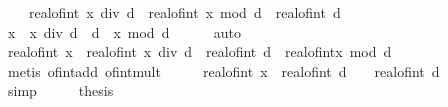 \begin{isabellebody}
\ \ \ \ real{\isacharunderscore}{\kern0pt}of{\isacharunderscore}{\kern0pt}int\ {\isacharparenleft}{\kern0pt}x\ div\ d{\isacharparenright}{\kern0pt}\ {\isacharplus}{\kern0pt}\ {\isacharparenleft}{\kern0pt}real{\isacharunderscore}{\kern0pt}of{\isacharunderscore}{\kern0pt}int\ {\isacharparenleft}{\kern0pt}x\ mod\ d{\isacharparenright}{\kern0pt}{\isacharparenright}{\kern0pt}\ {\isacharslash}{\kern0pt}\ {\isacharparenleft}{\kern0pt}real{\isacharunderscore}{\kern0pt}of{\isacharunderscore}{\kern0pt}int\ d{\isacharparenright}{\kern0pt}{\isachardoublequoteclose}\isanewline
%
\isadelimproof
%
\endisadelimproof
%
\isatagproof
{}\isamarkupfalse%
\ {\isacharminus}{\kern0pt}\isanewline
\ \ \isamarkupfalse%
\ {\isachardoublequoteopen}x\ {\isacharequal}{\kern0pt}\ {\isacharparenleft}{\kern0pt}x\ div\ d{\isacharparenright}{\kern0pt}\ {\isacharasterisk}{\kern0pt}\ d\ {\isacharplus}{\kern0pt}\ x\ mod\ d{\isachardoublequoteclose}\isanewline
\ \ \ \ \isamarkupfalse%
\ auto\isanewline
\ \ \isamarkupfalse%
\ \isamarkupfalse%
\ {\isachardoublequoteopen}real{\isacharunderscore}{\kern0pt}of{\isacharunderscore}{\kern0pt}int\ x\ {\isacharequal}{\kern0pt}\ real{\isacharunderscore}{\kern0pt}of{\isacharunderscore}{\kern0pt}int\ {\isacharparenleft}{\kern0pt}x\ div\ d{\isacharparenright}{\kern0pt}\ {\isacharasterisk}{\kern0pt}\ real{\isacharunderscore}{\kern0pt}of{\isacharunderscore}{\kern0pt}int\ d\ {\isacharplus}{\kern0pt}\ real{\isacharunderscore}{\kern0pt}of{\isacharunderscore}{\kern0pt}int{\isacharparenleft}{\kern0pt}x\ mod\ d{\isacharparenright}{\kern0pt}{\isachardoublequoteclose}\isanewline
\ \ \ \ \isamarkupfalse%
\ {\isacharparenleft}{\kern0pt}metis\ of{\isacharunderscore}{\kern0pt}int{\isacharunderscore}{\kern0pt}add\ of{\isacharunderscore}{\kern0pt}int{\isacharunderscore}{\kern0pt}mult{\isacharparenright}{\kern0pt}\isanewline
\ \ \isamarkupfalse%
\ \isamarkupfalse%
\ {\isachardoublequoteopen}real{\isacharunderscore}{\kern0pt}of{\isacharunderscore}{\kern0pt}int\ x\ {\isacharslash}{\kern0pt}\ real{\isacharunderscore}{\kern0pt}of{\isacharunderscore}{\kern0pt}int\ d\ {\isacharequal}{\kern0pt}\ {\isasymdots}\ {\isacharslash}{\kern0pt}\ real{\isacharunderscore}{\kern0pt}of{\isacharunderscore}{\kern0pt}int\ d{\isachardoublequoteclose}\isanewline
\ \ \ \ \isamarkupfalse%
\ simp\isanewline
\ \ \isamarkupfalse%
\ \isamarkupfalse%
\ {\isacharquery}{\kern0pt}thesis\isanewline
\ \ \ \ \isamarkupfalse%

\end{isabellebody}
